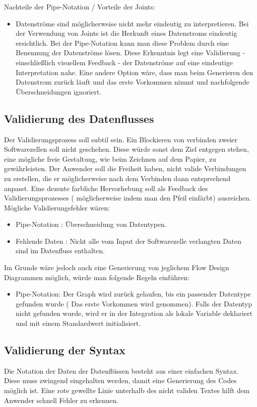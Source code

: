 Nachteile der Pipe-Notation / Vorteile der Joints:

\begin{itemize}
\item Datenströme sind möglicherweise nicht mehr eindeutig zu interpretieren. Bei
der Verwendung von Joints ist die Herkunft eines Datenstroms eindeutig
ersichtlich. Bei der Pipe-Notation kann man diese Problem durch eine Benennung
der Datenströme lösen. Diese Erkenntnis legt eine Validierung - einschließlich
visuellem Feedback - der Datenströme auf eine eindeutige Interpretation nahe.
Eine andere Option wäre, dass man beim Generieren den Datenstrom zurück läuft
und das erste Vorkommen nimmt und nachfolgende Überschneidungen ignoriert.
\end{itemize}


\subsection{Validierung des Datenflusses}

Der Validierungsprozess soll subtil sein. Ein Blockieren von verbinden zweier
Softwarezellen soll nicht geschehen. Diese würde sonst dem Ziel entgegen stehen, 
eine mögliche freie Gestaltung, wie beim Zeichnen auf dem Papier, zu
gewährleisten. Der Anwender soll die Freiheit haben, nicht valide Verbindungen
zu erstellen, die er möglicherweise nach dem Verbinden dann entsprechend
anpasst. Eine dezente farbliche Hervorhebung soll als Feedback des
Validierungsprozesses ( möglicherweise indem man den Pfeil einfärbt) ausreichen. Mögliche Validierungsfehler wären:
\begin{itemize}
\item Pipe-Notation : Überschneidung von Datentypen.
\item Fehlende Daten : Nicht alle vom Input der Softwarezelle verlangten Daten
sind im Datenfluss enthalten.
\end{itemize}

Im Grunde wäre jedoch auch eine Generierung von jeglichem Flow Design Diagrammen
möglich, würde man folgende Regeln einführen:
\begin{itemize}
\item Pipe-Notation: Der Graph wird zurück gelaufen, bis ein passender Datentype
gefunden wurde ( Das erste Vorkommen wird genommen). Falls der Datentyp nicht
gefunden wurde, wird er in der Integration als lokale Variable deklariert und mit einem
Standardwert initialisiert.
\end{itemize}

\subsection{Validierung der Syntax}

Die Notation der Daten der Datenflüssen besteht aus einer einfachen Syntax. Diese muss zwingend eingehalten
 werden, damit eine Generierung des Codes möglich ist.
 Eine rote gewellte Linie unterhalb des nicht validen Textes hilft dem Anwender
 schnell Fehler zu erkennen.

